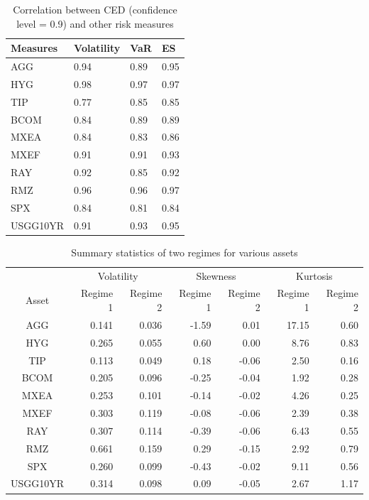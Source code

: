 \documentclass[11pt]{article}
\begin{document}
\begin{table}
\caption{Correlation between CED (confidence level = 0.9) and other risk measures}
\centering 
\begin{tabular}{| p{2cm}||p{2cm}|p{2cm}|p{2cm}|} 
\hline
Measures & Volatility & VaR & ES\\
  \hline
AGG & 0.94 & 0.89 & 0.95\\ 
HYG & 0.98 & 0.97 & 0.97\\ 
TIP & 0.77 & 0.85 & 0.85\\ 
BCOM & 0.84 & 0.89 & 0.89\\ 
MXEA & 0.84 & 0.83 & 0.86\\ 
MXEF & 0.91 & 0.91 & 0.93\\ 
RAY & 0.92 & 0.85 & 0.92\\ 
RMZ & 0.96 & 0.96 & 0.97\\ 
SPX & 0.84 & 0.81 & 0.84\\ 
USGG10YR & 0.91 & 0.93 & 0.95\\
\hline
\end{tabular}
\label{table:corrRiskMeasureCED}
\end{table}

\begin{table}
\caption{Summary statistics of two regimes for various assets} 
\centering 
\begin{tabular}{ | c || rr | rr | rr | } 
 \hline
& \multicolumn{2}{c|}{Volatility} & \multicolumn{2}{c|}{Skewness} & \multicolumn{2}{c|}{Kurtosis} \\
Asset & Regime 1 & Regime 2 & Regime 1 & Regime 2 & Regime 1 & Regime 2 \\
  \hline \hline
AGG & 0.141 & 0.036 & -1.59 &  0.01 & 17.15 &  0.60\\ 
HYG & 0.265 & 0.055 &  0.60 &  0.00 &  8.76 &  0.83\\ 
TIP & 0.113 & 0.049 &  0.18 & -0.06 &  2.50 &  0.16\\ 
BCOM & 0.205 & 0.096 & -0.25 & -0.04 &  1.92 &  0.28\\ 
MXEA & 0.253 & 0.101 & -0.14 & -0.02 &  4.26 &  0.25\\ 
MXEF & 0.303 & 0.119 & -0.08 & -0.06 &  2.39 &  0.38\\ 
RAY & 0.307 & 0.114 & -0.39 & -0.06 &  6.43 &  0.55\\ 
RMZ & 0.661 & 0.159 &  0.29 & -0.15 &  2.92 &  0.79\\ 
SPX & 0.260 & 0.099 & -0.43 & -0.02 &  9.11 &  0.56\\ 
USGG10YR & 0.314 & 0.098 &  0.09 & -0.05 &  2.67 &  1.17 \\
 \hline
\end{tabular}
\label{table:statSumRegime}
\end{table}
\end{document}
